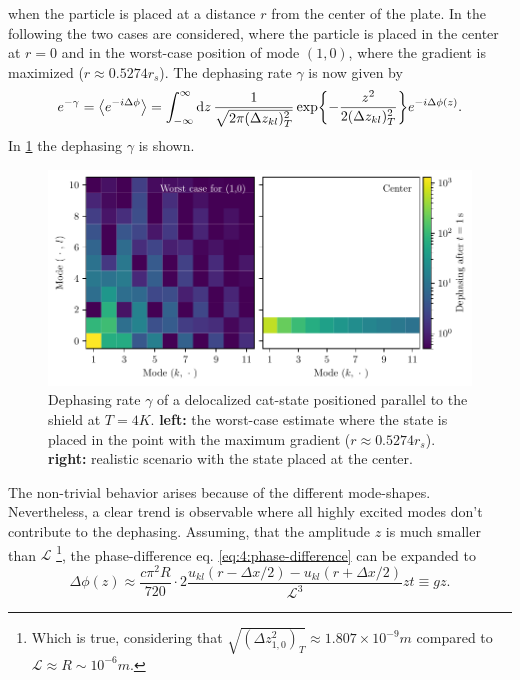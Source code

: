 when the particle is placed at a distance $r$ from the center of the plate. In the following the two cases are considered, where the particle is placed in the center at $r=0$ and in the worst-case position of mode $(1,0)$, where the gradient is maximized ($r \approx 0.5274 r_s$).
The dephasing rate $\gamma$ is now given by
\begin{equation}\label{eq:4:average-dephasing}
  e^{-\gamma} = \left\langle e^{-i\Delta\phi}\right\rangle = \int_{-\infty}^{\infty} \dd z \, \frac{1}{\sqrt{2 \pi (\Delta z_{kl})_T^2}} \exp{-\frac{z^2}{2 (\Delta z_{kl})_T^2}} e^{-i \Delta\phi(z)} .
\end{equation}
In \cref{fig:4:dephasing} the dephasing $\gamma$ is shown.
\begin{figure}[!htbp]
  \centering
  \includegraphics[width=\textwidth]{./../figures/vibrations/vibrational-dephasing-1s.pdf}
  \caption{Dephasing rate $\gamma$ of a delocalized cat-state positioned parallel to the shield at $T=4\si{K}$. \textbf{left:} the worst-case estimate where the state is placed in the point with the maximum gradient ($r\approx 0.5274 r_s$). \textbf{right:} realistic scenario with the state placed at the center.}
  \label{fig:4:dephasing}
\end{figure}
The non-trivial behavior arises because of the different mode-shapes. Nevertheless, a clear trend is observable where all highly excited modes don't contribute to the dephasing.
Assuming, that the amplitude $z$ is much smaller than $\mathscr{L}$ \footnote{Which is true, considering that $\sqrt{(\Delta z_{1,0}^2)_T}\approx 1.807 \times 10^{-9}\si{m}$ compared to $\mathscr{L} \approx R \sim 10^{-6}\si{m}$.}, the phase-difference eq. \eqref{eq:4:phase-difference} can be expanded to
\begin{equation}
  \Delta\phi(z) \approx \frac{c \pi^2 R}{720} \cdot 2 \frac{u_{kl}(r - \Delta x/2) -u_{kl}(r + \Delta x/2)}{\mathscr{L}^3} z t \equiv g z.
\end{equation}
